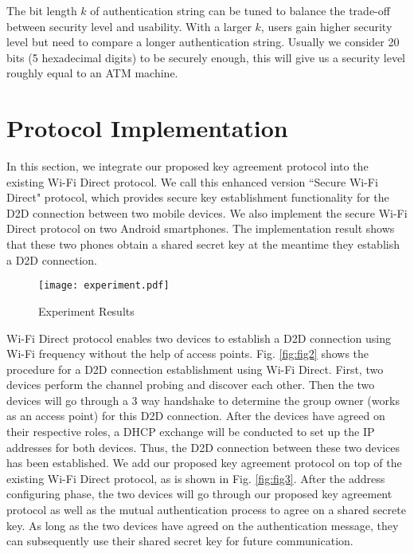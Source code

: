 \documentclass[conference]{IEEEtran}
\begin{document}
The bit length $k$ of authentication string can be tuned to balance the trade-off between security level and usability. With a larger $k$, users gain higher security level but need to compare a longer authentication string. Usually we consider 20 bits (5 hexadecimal digits) to be securely enough, this will give us a security level roughly equal to an ATM machine.


\section{Protocol Implementation \label{sec4}}


In this section, we integrate our proposed key agreement protocol into the existing Wi-Fi Direct protocol. We call this enhanced version ``Secure Wi-Fi Direct" protocol, which provides secure key establishment functionality for the D2D connection  between two mobile devices. We also implement the secure Wi-Fi Direct protocol on two Android smartphones. The implementation result shows that these two phones obtain a shared secret key at the meantime they establish a D2D connection. 

\begin{figure}[htbp]
  \centering
  \scalebox{0.4}
  {\texttt{[image: experiment.pdf]}}
  \caption{Experiment Results}
  \label{fig:fig1}
\end{figure}

Wi-Fi Direct protocol enables two devices to establish a D2D connection using Wi-Fi frequency without the help of access points. Fig. \ref{fig:fig2} shows the procedure for a D2D connection establishment using Wi-Fi Direct. First, two devices perform the channel probing and discover each other. Then the two devices will go through a 3 way handshake to determine the group owner (works as an access point) for this D2D connection. After the devices have agreed on their respective roles, a DHCP exchange will be conducted to set up the IP addresses for both devices. Thus, the D2D connection between these two devices has been established. We add our proposed key agreement protocol on top of the existing Wi-Fi Direct protocol, as is shown in Fig. \ref{fig:fig3}. After the address configuring phase, the two devices will go through our proposed key agreement protocol as well as the mutual authentication process to agree on a shared secrete key. As long as the two devices have agreed on the authentication message, they can subsequently use their shared secret key for future communication.
\end{document}
